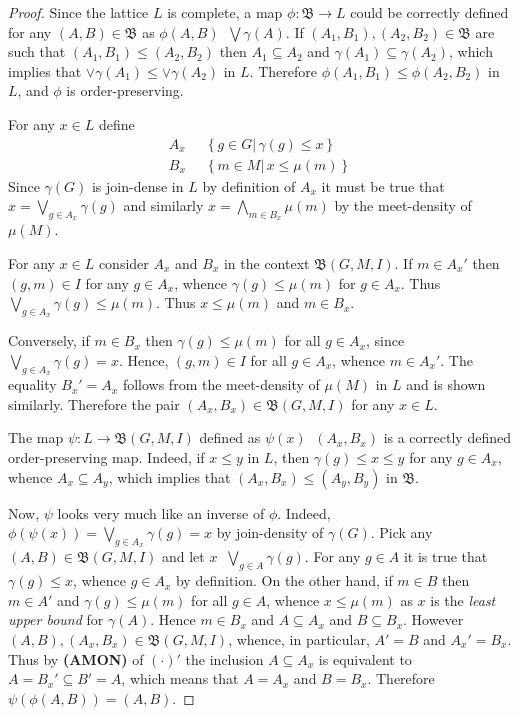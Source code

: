 \documentclass[a4paper]{article}
\newcommand{\obj}[1]{{\left\{ #1 \right \}}}
\newcommand{\brac}[1]{{\left ( #1 \right )}}
\newcommand{\induc}[1]{{\left . #1 \right \vert}}
\newcommand{\cltc}{\mathfrak{B}}
\newcommand{\defn}{\mathop{\overset{\Delta}{=}}\nolimits}
\begin{document}
\begin{proof}
Since the lattice $L$ is complete, a map $\phi:\cltc\to L$ could be correctly defined for any $(A,B)\in \cltc$ as $\phi(A,B)\defn \bigvee \gamma(A)$. If $(A_1,B_1),(A_2,B_2)\in \cltc$ are such that $(A_1,B_1)\leq(A_2,B_2)$ then $A_1\subseteq A_2$ and $\gamma(A_1)\subseteq \gamma(A_2)$, which implies that $\vee \gamma(A_1)\leq \vee \gamma(A_2)$ in $L$. Therefore $\phi(A_1,B_1)\leq \phi(A_2,B_2)$ in $L$,  and $\phi$ is order-preserving.

For any $x\in L$ define \begin{align*}
	A_x&\defn \obj{\induc{g\in G}\,\gamma(g)\leq x}\\
	B_x&\defn \obj{\induc{m\in M}\,x\leq \mu(m)}
\end{align*} Since $\gamma(G)$ is join-dense in $L$ by definition of $A_x$ it must be true that $x = \bigvee_{g\in A_x} \gamma(g)$ and similarly $x = \bigwedge_{m\in B_x} \mu(m)$ by the meet-density of $\mu(M)$.

For any $x\in L$ consider $A_x$ and $B_x$ in the context $\cltc(G,M,I)$. If $m\in A_x'$ then $(g,m)\in I$ for any $g\in A_x$, whence $\gamma(g)\leq \mu(m)$ for $g\in A_x$. Thus $\bigvee_{g\in A_x}\gamma(g)\leq\mu(m)$. Thus $x\leq \mu(m)$ and $m\in B_x$.

Conversely, if $m\in B_x$ then $\gamma(g)\leq\mu(m)$ for all $g\in A_x$, since $\bigvee_{g\in A_x}\gamma(g) = x$. Hence, $(g,m)\in I$ for all $g\in A_x$, whence $m\in A_x'$. The equality $B_x'=A_x$ follows from the meet-density of $\mu(M)$ in $L$ and is shown similarly. Therefore the pair $(A_x,B_x)\in \cltc(G,M,I)$ for any $x\in L$.

The map $\psi:L\to\cltc(G,M,I)$ defined as $\psi(x)\defn (A_x,B_x)$ is a correctly defined order-preserving map. Indeed, if $x\leq y$ in $L$, then $\gamma(g)\leq x\leq y$ for any $g\in A_x$, whence $A_x\subseteq A_y$, which implies that $(A_x,B_x)\leq (A_y,B_y)$ in $\cltc$.

Now, $\psi$ looks very much like an inverse of $\phi$. Indeed, $\phi\brac{\psi(x)} = \bigvee_{g\in A_x}\gamma(g) = x$ by join-density of $\gamma(G)$. Pick any $(A,B)\in \cltc(G,M,I)$ and let $x\defn \bigvee_{g\in A} \gamma(g)$. For any $g\in A$ it is true that $\gamma(g)\leq x$, whence $g\in A_x$ by definition. On the other hand, if $m\in B$ then $m\in A'$ and $\gamma(g)\leq \mu(m)$ for all $g\in A$, whence $x\leq \mu(m)$ as $x$ is the \emph{least upper bound} for $\gamma(A)$. Hence $m\in B_x$ and $A\subseteq A_x$ and $B\subseteq B_x$. However $(A,B),(A_x, B_x)\in \cltc(G,M,I)$, whence, in particular, $A'=B$ and $A_x'=B_x$. Thus by \textbf{(AMON)} of ${(\cdot)}'$ the inclusion $A\subseteq A_x$ is equivalent to $A = B_x' \subseteq B' = A$, which means that $A = A_x$ and $B=B_x$. Therefore $\psi\brac{\phi(A,B)}=(A,B)$.
\end{proof}
\end{document}
